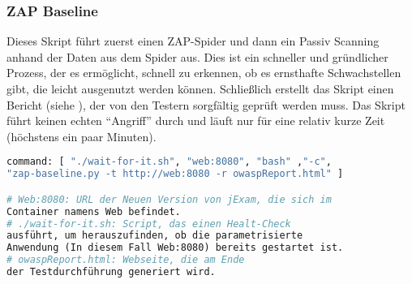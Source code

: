 \subsubsection{ZAP Baseline}

Dieses Skript führt zuerst einen ZAP-Spider und dann ein Passiv Scanning
anhand der Daten aus dem Spider aus. Dies ist ein schneller und gründlicher
Prozess, der es ermöglicht, schnell zu erkennen, ob es ernsthafte
Schwachstellen gibt, die leicht ausgenutzt werden können. Schließlich erstellt
das Skript einen Bericht (siehe ), der von den Testern sorgfältig geprüft werden muss.
Das Skript führt keinen echten ``Angriff'' durch und läuft nur für eine
relativ kurze Zeit (höchstens ein paar Minuten).


\begin{lstlisting}[language=Dockerfile,label={lst:baseline},caption={ZAP Baseline Ausführungsbefehl}]
command: [ "./wait-for-it.sh", "web:8080", "bash" ,"-c",
"zap-baseline.py -t http://web:8080 -r owaspReport.html" ]

# Web:8080: URL der Neuen Version von jExam, die sich im
Container namens Web befindet.
# ./wait-for-it.sh: Script, das einen Healt-Check
ausführt, um herauszufinden, ob die parametrisierte
Anwendung (In diesem Fall Web:8080) bereits gestartet ist.
# owaspReport.html: Webseite, die am Ende
der Testdurchführung generiert wird.
\end{lstlisting}
